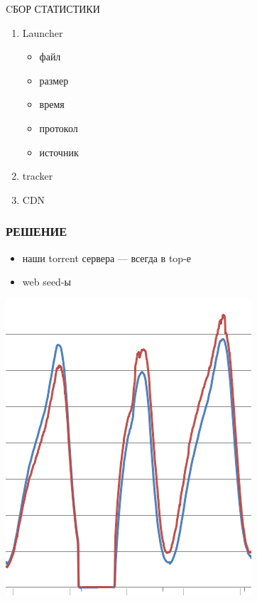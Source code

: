 \documentclass[aspectratio=169]{beamer}
\begin{document}
\begin{frame}{CБОР СТАТИСТИКИ}
    \begin{enumerate}
        \item Launcher
            \begin{itemize}
                \item файл
                \item размер
                \item время
                \item протокол
                \item источник
            \end{itemize}
        \item tracker
        \item CDN
    \end{enumerate}
\end{frame}

\begin{frame}
    \frametitle{РЕШЕНИЕ}
    \begin{itemize}
        \item наши torrent сервера --- всегда в top-е
        \item web seed-ы
    \end{itemize}
    \hspace*{2cm}
    \includegraphics[height=0.5\textheight]{ccu.png}
\end{frame}
\end{document}
